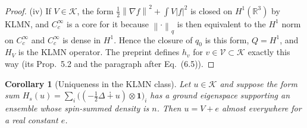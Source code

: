 \documentclass[11pt,a4paper]{article}
\theoremstyle{plain}
\newtheorem{corollary}[theorem]{Corollary}
\theoremstyle{definition}
\theoremstyle{remark}
\newcommand{\R}{\mathbb{R}}
\newcommand{\VV}{\mathcal{V}}
\newcommand{\KK}{\mathcal{K}}
\newcommand{\norm}[1]{\left\|#1\right\|}
\begin{document}
\begin{proof}
(iv) If $V\in\KK$, the form $\tfrac12\norm{\nabla f}^2+\int V|f|^2$ is closed on $H^1(\R^3)$ by KLMN, and $C_c^\infty$ is a core for it because $\norm\cdot_q$ is then equivalent to the $H^1$ norm on $C_c^\infty$ and $C_c^\infty$ is dense in $H^1$. Hence the closure of $q_0$ is this form, $Q=H^1$, and $H_V$ is the KLMN operator. The preprint defines $h_v$ for $v\in\VV\subset\KK$ exactly this way (its Prop.~5.2 and the paragraph after Eq.~(6.5)).
\end{proof}

\begin{corollary}[Uniqueness in the KLMN class]\label{cor:unique}
Let $u\in\KK$ and suppose the form sum $H_s(u)=\sum_i\big((-\tfrac12\Delta\dotplus u)\otimes\mathbf 1\big)_i$ has a ground eigenspace supporting an ensemble whose spin-summed density is $n$. Then $u=V+e$ almost everywhere for a real constant $e$.
\end{corollary}
\end{document}
